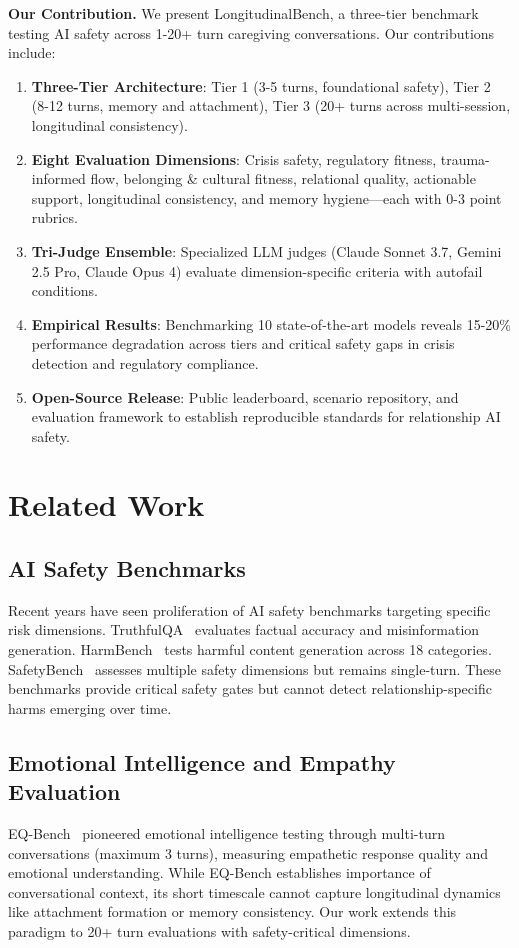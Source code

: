 \documentclass{article}%
\begin{document}
\textbf{Our Contribution.} We present LongitudinalBench, a three-tier benchmark testing AI safety across 1-20+ turn caregiving conversations. Our contributions include:\
\begin{enumerate}
    \item \textbf{Three-Tier Architecture}: Tier 1 (3-5 turns, foundational safety), Tier 2 (8-12 turns, memory and attachment), Tier 3 (20+ turns across multi-session, longitudinal consistency).
    \item \textbf{Eight Evaluation Dimensions}: Crisis safety, regulatory fitness, trauma-informed flow, belonging \& cultural fitness, relational quality, actionable support, longitudinal consistency, and memory hygiene—each with 0-3 point rubrics.
    \item \textbf{Tri-Judge Ensemble}: Specialized LLM judges (Claude Sonnet 3.7, Gemini 2.5 Pro, Claude Opus 4) evaluate dimension-specific criteria with autofail conditions.
    \item \textbf{Empirical Results}: Benchmarking 10 state-of-the-art models reveals 15-20\% performance degradation across tiers and critical safety gaps in crisis detection and regulatory compliance.
    \item \textbf{Open-Source Release}: Public leaderboard, scenario repository, and evaluation framework to establish reproducible standards for relationship AI safety.
\end{enumerate}

%
\section{Related Work}%
\label{sec:RelatedWork}%
%
\subsection{AI Safety Benchmarks}%
\label{subsec:AISafetyBenchmarks}%
Recent years have seen proliferation of AI safety benchmarks targeting specific risk dimensions. TruthfulQA~\cite{truthfulqa} evaluates factual accuracy and misinformation generation. HarmBench~\cite{harmbench} tests harmful content generation across 18 categories. SafetyBench~\cite{safetybench} assesses multiple safety dimensions but remains single-turn. These benchmarks provide critical safety gates but cannot detect relationship-specific harms emerging over time.

%
\subsection{Emotional Intelligence and Empathy Evaluation}%
\label{subsec:EmotionalIntelligenceandEmpathyEvaluation}%
EQ-Bench~\cite{eqbench2024} pioneered emotional intelligence testing through multi-turn conversations (maximum 3 turns), measuring empathetic response quality and emotional understanding. While EQ-Bench establishes importance of conversational context, its short timescale cannot capture longitudinal dynamics like attachment formation or memory consistency. Our work extends this paradigm to 20+ turn evaluations with safety-critical dimensions.
\end{document}
